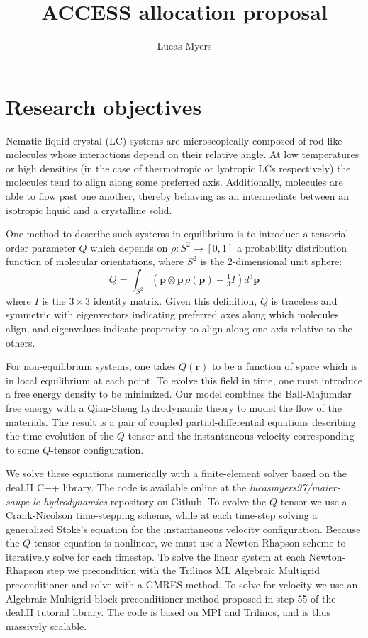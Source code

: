 \documentclass[reqno]{article}
\begin{document}
\title{ACCESS allocation proposal}
\author{Lucas Myers}
\maketitle

\section{Research objectives}
Nematic liquid crystal (LC) systems are microscopically composed of rod-like molecules whose interactions depend on their relative angle.
At low temperatures or high densities (in the case of thermotropic or lyotropic LCs respectively) the molecules tend to align along some preferred axis. 
Additionally, molecules are able to flow past one another, thereby behaving as an intermediate between an isotropic liquid and a crystalline solid. \cite{selinger_introduction_2016}

One method to describe such systems in equilibrium is to introduce a tensorial order parameter $Q$ which depends on $\rho: S^2 \to [0, 1]$ a probability distribution function of molecular orientations, where $S^2$ is the 2-dimensional unit sphere:
\begin{equation}
    Q
    =
    \int_{S^2} \left(
        \mathbf{p} \otimes \mathbf{p} \, \rho(\mathbf{p}) - \tfrac13 I
    \right)
    d^3 \mathbf{p}
\end{equation}
where $I$ is the $3\times 3$ identity matrix.
Given this definition, $Q$ is traceless and symmetric with eigenvectors indicating preferred axes along which molecules align, and eigenvalues indicate propensity to align along one axis relative to the others. 

For non-equilibrium systems, one takes $Q(\mathbf{r})$ to be a function of space which is in local equilibrium at each point.
To evolve this field in time, one must introduce a free energy density to be minimized.
Our model combines the Ball-Majumdar free energy with a Qian-Sheng hydrodynamic theory to model the flow of the materials.
The result is a pair of coupled partial-differential equations describing the time evolution of the $Q$-tensor and the instantaneous velocity corresponding to some $Q$-tensor configuration. 

We solve these equations numerically with a finite-element solver based on the deal.II C++ library.
The code is available online at the \textit{lucasmyers97/maier-saupe-lc-hydrodynamics} repository on Github.
To evolve the $Q$-tensor we use a Crank-Nicolson time-stepping scheme, while at each time-step solving a generalized Stoke's equation for the instantaneous velocity configuration.
Because the $Q$-tensor equation is nonlinear, we must use a Newton-Rhapson scheme to iteratively solve for each timestep.
To solve the linear system at each Newton-Rhapson step we precondition with the Trilinos ML Algebraic Multigrid preconditioner and solve with a GMRES method.
To solve for velocity we use an Algebraic Multigrid block-preconditioner method proposed in step-55 of the deal.II tutorial library. 
The code is based on MPI and Trilinos, and is thus massively scalable. 


{}

% 
% 
% 
\end{document}

